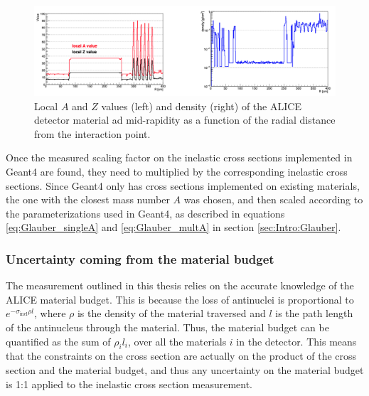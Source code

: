 \begin{figure}
    \centering
    \includegraphics[width=\textwidth]{figures/averageA.png}
    \caption{Local $A$ and $Z$ values (left) and density (right) of the ALICE detector material ad mid-rapidity as a function of the radial distance from the interaction point.}
    \label{fig:localMaterialValuesALICE}
\end{figure}

Once the measured scaling factor on the inelastic cross sections implemented in Geant4 are found, they need to multiplied by the corresponding inelastic cross sections. Since Geant4 only has cross sections implemented on existing materials, the one with the closest mass number $A$ was chosen, and then scaled according to the parameterizations used in Geant4, as described in equations \ref{eq:Glauber_singleA} and \ref{eq:Glauber_multA} in section \ref{sec:Intro:Glauber}.

\subsubsection{Uncertainty coming from the material budget}
The measurement outlined in this thesis relies on the accurate knowledge of the ALICE material budget. This is because the loss of antinuclei is proportional to $e^{-\sigma_\mathrm{inel} \rho l}$, where $\rho$ is the density of the material traversed and $l$ is the path length of the antinucleus through the material. Thus, the material budget can be quantified as the sum of $\rho_i l_i$, over all the materials $i$ in the detector. This means that the constraints on the cross section are actually on the product of the cross section and the material budget, and thus any uncertainty on the material budget is 1:1 applied to the inelastic cross section measurement. \\

